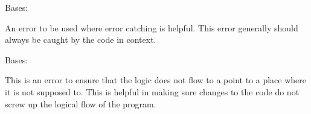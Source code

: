 \documentclass[letterpaper,11pt,english]{sphinxmanual}
\begin{document}
\begin{savenotes}\begin{fulllineitems}
\label{\detokenize{code/opihiexarata.library.error:opihiexarata.library.error.IntentionalError}}
\pysigstartsignatures
{}
\pysigstopsignatures
\sphinxAtStartPar
Bases: {\hyperref[\detokenize{code/opihiexarata.library.error:opihiexarata.library.error.ExarataException}]{}}

\sphinxAtStartPar
An error to be used where error catching is helpful. This error
generally should always be caught by the code in context.

\end{fulllineitems}\end{savenotes}


\begin{savenotes}\begin{fulllineitems}
\label{\detokenize{code/opihiexarata.library.error:opihiexarata.library.error.LogicFlowError}}
\pysigstartsignatures
{}
\pysigstopsignatures
\sphinxAtStartPar
Bases: {\hyperref[\detokenize{code/opihiexarata.library.error:opihiexarata.library.error.ExarataBaseException}]{}}

\sphinxAtStartPar
This is an error to ensure that the logic does not flow to a point to a
place where it is not supposed to. This is helpful in making sure changes
to the code do not screw up the logical flow of the program.

\end{fulllineitems}\end{savenotes}

\end{document}
